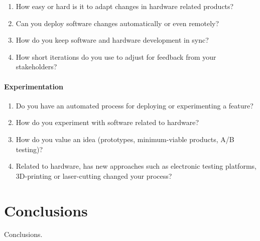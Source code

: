 \documentclass[english]{tktltiki2}
\begin{document}
\begin{enumerate}[resume]

    \item How easy or hard is it to adapt changes in hardware related products?
    \item Can you deploy software changes automatically or even remotely?
    \item How do you keep software and hardware development in sync?
    \item How short iterations do you use to adjust for feedback from your stakeholders?

\end{enumerate}

\paragraph{Experimentation}

\begin{enumerate}[resume]

    \item Do you have an automated process for deploying or experimenting a feature?
    \item How do you experiment with software related to hardware?
    \item How do you value an idea (prototypes, minimum-viable products, A/B testing)?
    \item Related to hardware, has new approaches such as electronic testing platforms, 3D-printing or laser-cutting changed your process?

\end{enumerate}


\section{Conclusions}

Conclusions.




\end{document}
